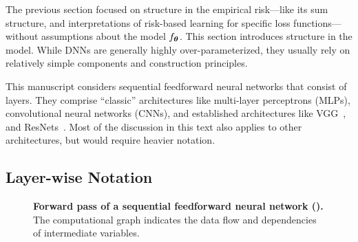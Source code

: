 The previous section focused on structure in the empirical risk---like its sum
structure, and interpretations of risk-based learning for specific loss
functions---without assumptions about the model $f_{{\bm{\theta}}}$. This section
introduces structure in the model. While DNNs are generally highly
over-parameterized, they usually rely on relatively simple components and
construction principles.

This manuscript considers sequential feedforward neural networks that consist of
layers. They comprise ``classic'' architectures like multi-layer perceptrons
(MLPs), convolutional neural networks (CNNs), and established architectures like
VGG~\cite{simonyan2015deep}, and ResNets~\cite{he2016deep}. Most of the
discussion in this text also applies to other architectures, but would require
heavier notation.

\subsection{Layer-wise Notation}

\tikzexternalenable
\begin{figure*}[!t]
  \centering \resizebox{\linewidth}{!}{ {\footnotesize
      }}
  \caption{\textbf{Forward pass of a sequential feedforward neural network
      ().} The computational graph indicates
    the data flow and dependencies of intermediate
    variables.}\label{fig:background::neuralNetwork}
\end{figure*}
\tikzexternaldisable

